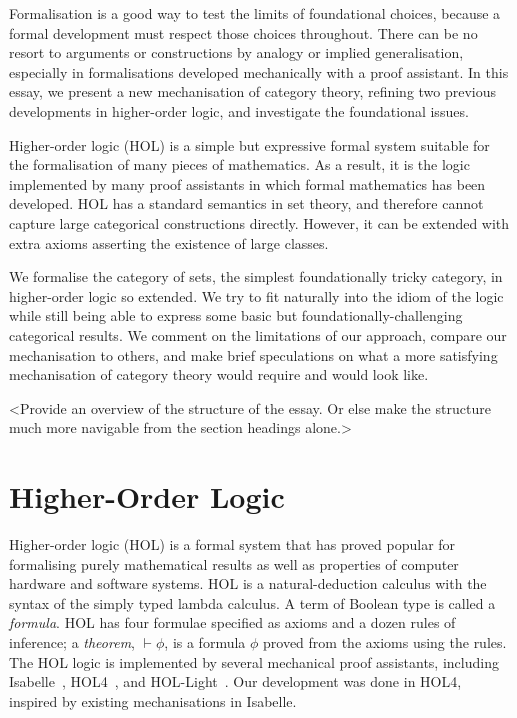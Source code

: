 \documentclass[twoside,titlepage,11pt]{article}
\begin{document}
Formalisation is a good way to test the limits of foundational choices, because a formal development must respect those choices throughout.
There can be no resort to arguments or constructions by analogy or implied generalisation, especially in formalisations developed mechanically with a proof assistant.
In this essay, we present a new mechanisation of category theory, refining two previous developments in higher-order logic, and investigate the foundational issues.

Higher-order logic (HOL) is a simple but expressive formal system suitable for the formalisation of many pieces of mathematics.
As a result, it is the logic implemented by many proof assistants in which formal mathematics has been developed.
HOL has a standard semantics in set theory, and therefore cannot capture large categorical constructions directly.
However, it can be extended with extra axioms asserting the existence of large classes.

We formalise the category of sets, the simplest foundationally tricky category, in higher-order logic so extended.
We try to fit naturally into the idiom of the logic while still being able to express some basic but foundationally-challenging categorical results.
We comment on the limitations of our approach, compare our mechanisation to others, and make brief speculations on what a more satisfying mechanisation of category theory would require and would look like.

<Provide an overview of the structure of the essay. Or else make the structure much more navigable from the section headings alone.>
\section{Higher-Order Logic}%
\newcommand{\bool}{\ensuremath{\mathsf{bool}}}
Higher-order logic (HOL) is a formal system that has proved popular for formalising purely mathematical results as well as properties of computer hardware and software systems.
HOL is a natural-deduction calculus with the syntax of the simply typed lambda calculus.
A term of Boolean type is called a \emph{formula}.
HOL has four formulae specified as axioms and a dozen rules of inference; a \emph{theorem}, $\vdash\phi$, is a formula $\phi$ proved from the axioms using the rules.
The HOL logic is implemented by several mechanical proof assistants, including Isabelle~\cite{DBLP:conf/tphol/WenzelPN08}, HOL4~\cite{DBLP:conf/tphol/SlindN08}, and HOL-Light~\cite{DBLP:conf/tphol/Harrison09a}.
Our development was done in HOL4, inspired by existing mechanisations \cite{Katovsky,DBLP:journals/entcs/OKeefe04} in Isabelle.
\end{document}
